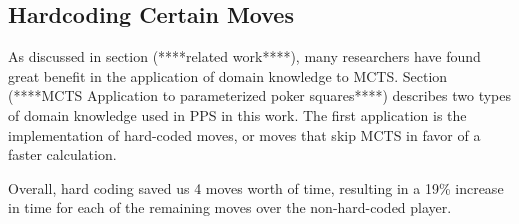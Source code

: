 \documentclass[letterpaper]{article}
\begin{document}
%
%
%



\subsection{Hardcoding Certain Moves}

As discussed in section (****related work****), many researchers have found great benefit in the application of domain knowledge to MCTS. Section (****MCTS Application to parameterized poker squares****) describes two types of domain knowledge used in PPS in this work. The first application is the implementation of hard-coded moves, or moves that skip MCTS in favor of a faster calculation.

Overall, hard coding saved us 4 moves worth of time, resulting in a 19\% increase in time for each of the remaining moves over the non-hard-coded player.
	
\end{document}
